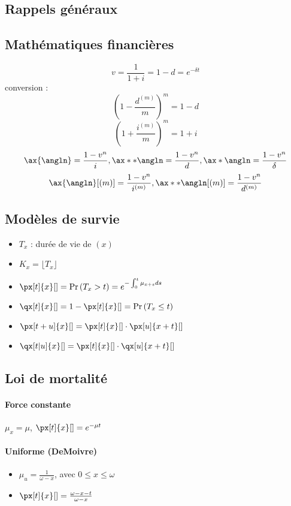 \documentclass[10pt, french]{article}
\begin{document}
\begin{multicols*}{2} %
\section{Rappels généraux}
\subsection*{Mathématiques financières}
\[v = \frac{1}{1+i} = 1 - d = e^{-\delta t}\]
conversion : 
\[   \left(1 - \frac{d^{(m)}}{m} \right)^m = 1  - d  \]
\[\left(1 + \frac{i^{(m)}}{m} \right)^m = 1  +i\]
\[ \ax{\angln} = \frac{1 - v^n}{i}, \ax**{\angln} = \frac{1 - v^n}{d}, \ax*{\angln} = \frac{1 - v^n}{\delta}  \]
\[\ax{\angln}[(m)] = \frac{1 - v^n}{i^{(m)}} , \ax**{\angln}[(m)] = \frac{1 - v^n}{d^{(m)}}   \]

\subsection*{Modèles de survie}
\begin{itemize}
\item $T_x$ : durée de vie de $(x)$
\item $K_x =  \lfloor T_x \rfloor$
\item $\px[t]{x}[] = \prob{T_x > t} = e^{- \int_{0}^{t} \mu_{x+s} ds}$
\item $\qx[t]{x}[] = 1 - \px[t]{x}[] = \prob{T_x \leq t}$
\item $\px[t + u]{x}[] = \px[t]{x}[] \cdot \px[u]{x+t}[]$
\item $\qx[t|u]{x}[] = \px[t]{x}[] \cdot \qx[u]{x+t}[]$
\end{itemize}

\subsection*{Loi de mortalité}
\paragraph{Force constante}
$\mu_x = \mu$, $\px[t]{x}[] = e^{-\mu t}$

\paragraph{Uniforme (DeMoivre)}
\begin{itemize}
\item  $\mu_u = \frac{1}{\omega - x}$, avec $0 \leq x \leq \omega$
\item $\px[t]{x}[] = \frac{\omega - x - t}{\omega - x}$
\end{itemize}


\end{multicols*}
\end{document}
